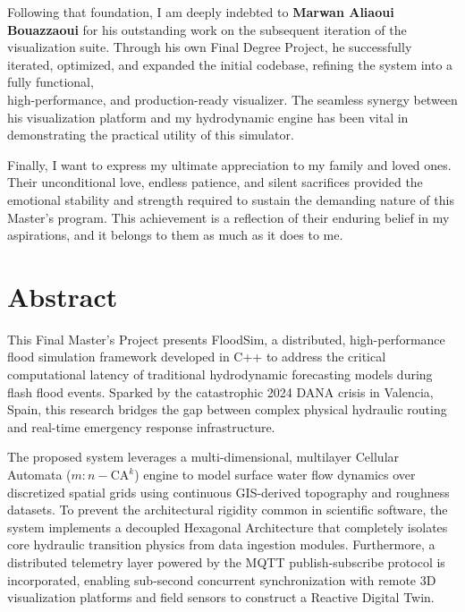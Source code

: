 Following that foundation, I am deeply indebted to \textbf{Marwan Aliaoui Bouazzaoui} for his outstanding work on the subsequent iteration 
of the visualization suite. Through his own Final Degree Project, he successfully iterated, optimized, and expanded the initial codebase, 
refining the system into a fully functional, \\ high-performance, and production-ready visualizer. The seamless synergy between his 
visualization platform and my hydrodynamic engine has been vital in demonstrating the practical utility of this simulator.

Finally, I want to express my ultimate appreciation to my family and loved ones. Their unconditional love, endless patience, and silent 
sacrifices provided the emotional stability and strength required to sustain the demanding nature of this Master's program. This achievement 
is a reflection of their enduring belief in my aspirations, and it belongs to them as much as it does to me.

\chapter*{Abstract}

\onehalfspacing

This Final Master’s Project presents FloodSim, a distributed, high-performance flood simulation framework developed in C++ to address 
the critical computational latency of traditional hydrodynamic forecasting models during flash flood events. Sparked by the catastrophic 
2024 DANA crisis in Valencia, Spain, this research bridges the gap between complex physical hydraulic routing and real-time emergency 
response infrastructure.

The proposed system leverages a multi-dimensional, multilayer Cellular Automata ($m:n-\text{CA}^k$) engine to model surface water flow 
dynamics over discretized spatial grids using continuous GIS-derived topography and roughness datasets. To prevent the architectural 
rigidity common in scientific software, the system implements a decoupled Hexagonal Architecture that completely isolates core hydraulic 
transition physics from data ingestion modules. Furthermore, a distributed telemetry layer powered by the MQTT publish-subscribe protocol 
is incorporated, enabling sub-second concurrent synchronization with remote 3D visualization platforms and field sensors to construct a 
Reactive Digital Twin.

